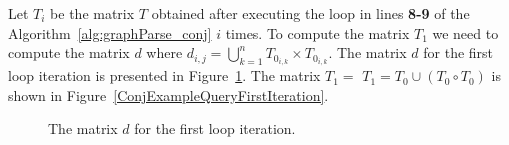 Let $T_i$ be the matrix $T$ obtained after executing the loop in lines \textbf{8-9} of the Algorithm~\ref{alg:graphParse_conj} $i$ times. To compute the matrix $T_1$ we need to compute the matrix $d$ where $d_{i,j} = \bigcup^{n}_{k=1}{T_{0_{i,k}} \times T_{0_{i,k}}}$. The matrix $d$ for the first loop iteration is presented in Figure~\ref{dmatrix}. The matrix $T_1 = $ $T_1 = T_0 \cup (T_0 \circ T_0)$ is shown in Figure~\ref{ConjExampleQueryFirstIteration}.

\begin{figure}[h]
	\noindent
	\caption{The matrix $d$ for the first loop iteration.}
	\label{dmatrix}
\end{figure}

